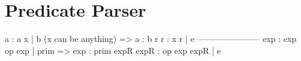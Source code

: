 \section{Predicate  Parser}


  \begin{bluetext}
    a : a x | b (x can be anything)
    =>
    a : b r
    r : x r | e
    -----------------------
    exp : exp op exp | prim
    =>
    exp : prim expR
    expR : op exp expR | e 
  \end{bluetext}



